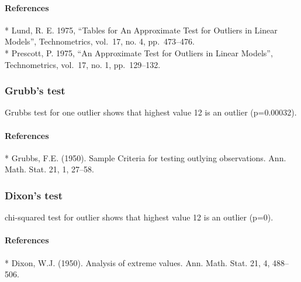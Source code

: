 \documentclass{article}
\begin{document}
\paragraph{References}

{%
}
{%
\FL
* Lund, R. E. 1975, ``Tables for An Approximate Test for Outliers in
Linear Models'', Technometrics, vol.~17, no. 4, pp.~473--476.
\\\noalign{\medskip}
* Prescott, P. 1975, ``An Approximate Test for Outliers in Linear
Models'', Technometrics, vol.~17, no. 1, pp.~129--132.
\LL
}

\subsubsection{Grubb's test}

{%
}
{%
\FL
Grubbs test for one outlier shows that highest value 12 is an outlier
(p=0.00032).
\LL
}

\paragraph{References}

{%
}
{%
\FL
* Grubbs, F.E. (1950). Sample Criteria for testing outlying
observations. Ann. Math. Stat. 21, 1, 27--58.
\LL
}

\subsubsection{Dixon's test}

{%
}
{%
\FL
chi-squared test for outlier shows that highest value 12 is an outlier
(p=0).
\LL
}

\paragraph{References}

{%
}
{%
\FL
* Dixon, W.J. (1950). Analysis of extreme values. Ann. Math. Stat. 21,
4, 488--506.
\LL
}
\end{document}
